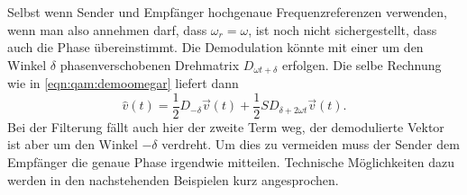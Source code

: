 Selbst wenn Sender und Empfänger hochgenaue Frequenzreferenzen verwenden,
wenn man also annehmen darf, dass $\omega_r=\omega$,
ist noch nicht sichergestellt, dass auch die Phase übereinstimmt.
Die Demodulation könnte mit einer um den Winkel $\delta$
phasenverschobenen Drehmatrix $D_{\omega t+\delta}$ erfolgen.
Die selbe Rechnung wie in \eqref{eqn:qam:demoomegar} liefert dann
\[
\hat{v}(t)
=
\frac12D_{-\delta}\vec{v}(t)
+
\frac12SD_{\delta+2\omega t}\vec{v}(t).
\]
Bei der Filterung fällt auch hier der zweite Term weg, der demodulierte
Vektor ist aber um den Winkel $-\delta$ verdreht.
Um dies zu vermeiden muss der Sender dem Empfänger die genaue Phase
irgendwie mitteilen.
Technische Möglichkeiten dazu werden in den nachstehenden Beispielen
kurz angesprochen.







